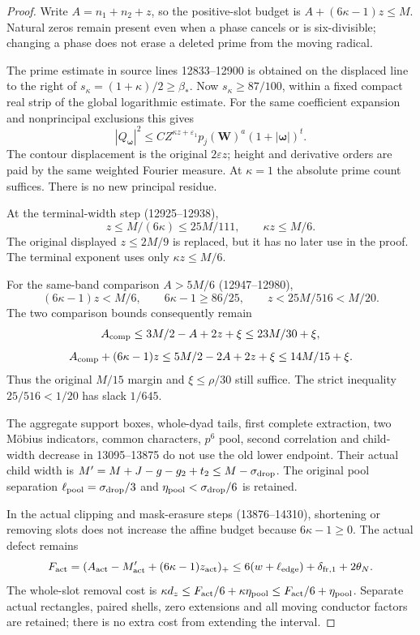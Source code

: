 \documentclass[11pt,a4paper]{article}
\theoremstyle{definition}
\newcommand{\eps}{\varepsilon}
\newcommand{\bet}{\beta_*}
\begin{document}
\begin{proof}
Write $A=n_1+n_2+z$, so the positive-slot budget is
$A+(6\kappa-1)z\le M$. Natural zeros remain present even when a
phase cancels or is six-divisible; changing a phase does not erase
a deleted prime from the moving radical.

The prime estimate in source lines 12833--12900 is obtained on
the displaced line to the right of
$s_\kappa=(1+\kappa)/2\ge\bet$.
Now $s_\kappa\ge87/100$, within a fixed compact real strip of
the global logarithmic estimate. For the same coefficient expansion
and nonprincipal exclusions this gives
\[
 |Q_{\boldsymbol\omega}|^2
 \le C Z^{\kappa z+\eps_1}p_j(\boldsymbol W)^a
                         (1+|\boldsymbol\omega|)^t .
\]
The contour displacement is the original $2\eps z$; height
and derivative orders are paid by the same weighted Fourier measure.
At $\kappa=1$ the absolute prime count suffices.
There is no new principal residue.

At the terminal-width step (12925--12938),
\[
 z\le M/(6\kappa)\le25M/111,\qquad \kappa z\le M/6.
\]
The original displayed $z\le2M/9$ is replaced, but it has no later
use in the proof. The terminal exponent uses only $\kappa z\le M/6$.

For the same-band comparison $A>5M/6$ (12947--12980),
\[
 (6\kappa-1)z<M/6,\qquad
 6\kappa-1\ge86/25,\qquad z<25M/516<M/20.
\]
The two comparison bounds consequently remain
\[
 A_{\rm comp}\le3M/2-A+2z+\xi\le23M/30+\xi,
\]
\[
 A_{\rm comp}+(6\kappa-1)z
 \le5M/2-2A+2z+\xi\le14M/15+\xi .
\]
Thus the original $M/15$ margin and $\xi\le\rho/30$ still suffice.
The strict inequality $25/516<1/20$ has slack $1/645$.

The aggregate support boxes, whole-dyad tails, first complete
extraction, two M\"obius indicators, common characters, $p^6$ pool,
second correlation and child-width decrease in 13095--13875
do not use the old lower endpoint. Their actual child width is
$M'=M+J-g-g_2+t_2\le M-\sigma_{\rm drop}$.
The original pool separation
$\ell_{\rm pool}=\sigma_{\rm drop}/3$ and
$\eta_{\rm pool}<\sigma_{\rm drop}/6$ is retained.

In the actual clipping and mask-erasure steps (13876--14310),
shortening or removing slots does not increase the affine
budget because $6\kappa-1\ge0$. The actual defect remains
\[
 F_{\rm act}
 =(A_{\rm act}-M'_{\rm act}+(6\kappa-1)z_{\rm act})_+
 \le6(w+\ell_{\rm edge})+\delta_{{\rm fr},1}+2\theta_N.
\]
The whole-slot removal cost is
$\kappa d_z\le F_{\rm act}/6+\kappa\eta_{\rm pool}
             \le F_{\rm act}/6+\eta_{\rm pool}$.
Separate actual rectangles, paired shells, zero extensions and
all moving conductor factors are retained; there is no extra
cost from extending the interval.


\end{proof}
\end{document}
